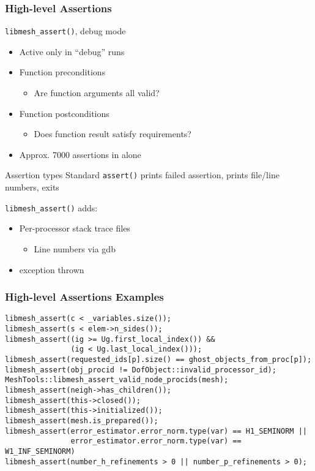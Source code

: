 \begin{frame}
\frametitle{High-level Assertions}
\begin{block}{{\texttt{libmesh\_assert()}, \PETSc} debug mode}
\begin{itemize}
\item Active only in ``debug'' runs
\item Function preconditions
\begin{itemize}
\item Are function arguments all valid?
\end{itemize}
\item Function postconditions
\begin{itemize}
\item Does function result satisfy requirements?
\end{itemize}
\item Approx. 7000 assertions in \libMesh{} alone
\end{itemize}
\end{block}

\begin{block}{Assertion types}
Standard \texttt{assert()} prints failed assertion, prints file/line numbers, exits

\texttt{libmesh\_assert()} adds:
\begin{itemize}
\item Per-processor stack trace files
\begin{itemize}
\item Line numbers via gdb
\end{itemize}
\item \cpp{} exception thrown
\end{itemize}
\end{block}

\end{frame}

\begin{frame}[fragile]
\frametitle{High-level Assertions Examples}
{\footnotesize
\begin{verbatim}
libmesh_assert(c < _variables.size());
libmesh_assert(s < elem->n_sides());
libmesh_assert((ig >= Ug.first_local_index()) &&
               (ig < Ug.last_local_index()));
libmesh_assert(requested_ids[p].size() == ghost_objects_from_proc[p]);
libmesh_assert(obj_procid != DofObject::invalid_processor_id);
MeshTools::libmesh_assert_valid_node_procids(mesh);
libmesh_assert(neigh->has_children());
libmesh_assert(this->closed());
libmesh_assert(this->initialized());
libmesh_assert(mesh.is_prepared());
libmesh_assert(error_estimator.error_norm.type(var) == H1_SEMINORM ||
               error_estimator.error_norm.type(var) == W1_INF_SEMINORM)
libmesh_assert(number_h_refinements > 0 || number_p_refinements > 0);
\end{verbatim}
}
\end{frame}

